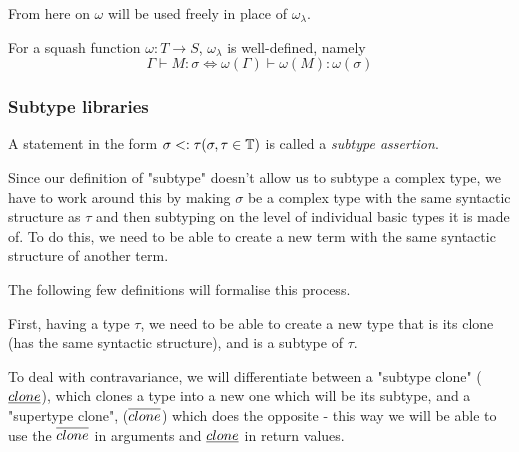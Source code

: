\documentclass[main.tex]{subfiles}
\begin{document}
From here on $\omega$ will be used freely in place of $\omega_{\lambda}$.

\begin{prop}
    For a squash function $\omega: T \rightarrow S$, $\omega_{\lambda}$ is
    well-defined, namely
    \[ \Gamma \vdash M : \sigma \iff \omega(\Gamma) \vdash \omega(M) : \omega(\sigma) \]
\end{prop}

\subsubsection{Subtype libraries}
\begin{defn}
    A statement in the form $\sigma <: \tau (\sigma, \tau \in \mathbb{T})$
    is called a \emph{subtype assertion}.
\end{defn}

Since our definition of "subtype" doesn't allow us to subtype a complex type,
we have to work around this by making $\sigma$ be a complex type with the same
syntactic structure as $\tau$ and then subtyping on the level of individual
basic types it is made of. To do this, we need to be able to create a new term
with the same syntactic structure of another term.


The following few definitions will formalise this process.

First, having a type $\tau$, we need to be able to create a new type
that is its clone
(has the same syntactic structure), and is a subtype of $\tau$.

To deal with contravariance, we will differentiate between a "subtype clone"
($\underline{clone}$),
which clones a type into a new one which will be its subtype, and a
"supertype clone", ($\overline{clone}$)
which does the opposite - this way we will be able to
use the $\overline{clone}$ in arguments and $\underline{clone}$ in return
values.
\end{document}
